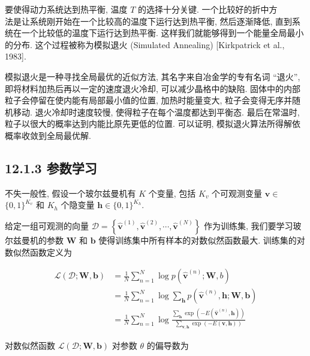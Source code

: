 \documentclass[10pt]{article}
\begin{document}
要使得动力系统达到热平衡, 温度 $T$ 的选择十分关键. 一个比较好的折中方\\
法是让系统刚开始在一个比较高的温度下运行达到热平衡, 然后逐渐降低, 直到系统在一个比较低的温度下运行达到热平衡. 这样我们就能够得到一个能量全局最小的分布. 这个过程被称为模拟退火 (Simulated Annealing) [Kirkpatrick et al., 1983].

模拟退火是一种寻找全局最优的近似方法, 其名字来自冶金学的专有名词 “退火”, 即将材料加热后再以一定的速度退火冷却, 可以减少晶格中的缺陷. 固体中的内部粒子会停留在使内能有局部最小值的位置, 加热时能量变大, 粒子会变得无序并随机移动. 退火冷却时速度较慢, 使得粒子在每个温度都达到平衡态. 最后在常温时, 粒子以很大的概率达到内能比原先更低的位置. 可以证明, 模拟退火算法所得解依概率收敛到全局最优解.

\subsection*{12.1.3 参数学习}
不失一般性, 假设一个玻尔兹曼机有 $K$ 个变量, 包括 $K_{v}$ 个可观测变量 $\boldsymbol{v} \in$ $\{0,1\}^{K_{v}}$ 和 $K_{h}$ 个隐变量 $\boldsymbol{h} \in\{0,1\}^{K_{h}}$.

给定一组可观测的向量 $\mathcal{D}=\left\{\hat{\boldsymbol{v}}^{(1)}, \hat{\boldsymbol{v}}^{(2)}, \cdots, \hat{\boldsymbol{v}}^{(N)}\right\}$ 作为训练集, 我们要学习玻尔兹曼机的参数 $\boldsymbol{W}$ 和 $\boldsymbol{b}$ 使得训练集中所有样本的对数似然函数最大. 训练集的对数似然函数定义为


\begin{align*}
\mathcal{L}(\mathcal{D} ; \boldsymbol{W}, \boldsymbol{b}) & =\frac{1}{N} \sum_{n=1}^{N} \log p\left(\hat{\boldsymbol{v}}^{(n)} ; \boldsymbol{W}, b\right)  \tag{12.16}\\
& =\frac{1}{N} \sum_{n=1}^{N} \log \sum_{\boldsymbol{h}} p\left(\hat{\boldsymbol{v}}^{(n)}, \boldsymbol{h} ; \boldsymbol{W}, \boldsymbol{b}\right)  \tag{12.17}\\
& =\frac{1}{N} \sum_{n=1}^{N} \log \frac{\sum_{\boldsymbol{h}} \exp \left(-E\left(\hat{\boldsymbol{v}}^{(n)}, \boldsymbol{h}\right)\right)}{\sum_{\boldsymbol{v}, \boldsymbol{h}} \exp (-E(\boldsymbol{v}, \boldsymbol{h}))} \tag{12.18}
\end{align*}


对数似然函数 $\mathcal{L}(\mathcal{D} ; \boldsymbol{W}, \boldsymbol{b})$ 对参数 $\theta$ 的偏导数为
\end{document}
